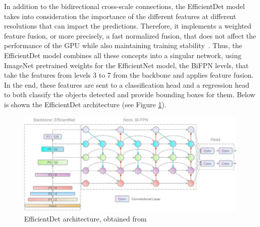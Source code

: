 In addition to the bidirectional cross-scale connections, the EfficientDet model takes into consideration the importance of the different features at different resolutions that can impact the predictions. Therefore, it implements a weighted feature fusion, or more precisely, a fast normalized fusion, that does not affect the performance of the GPU while also maintaining training stability~\cite{carte8}.
Thus, the EfficientDet model combines all these concepts into a singular network, using ImageNet pretrained weights for the EfficientNet model, the BiFPN levels, that take the features from levels 3 to 7 from the backbone and applies feature fusion. In the end, these features are sent to a classification head and a regression head to both classify the objects detected and provide bounding boxes for them. Below is shown the EfficientDet architecture (see Figure \ref{fig:fig7}).

\begin{figure}[!ht]
    \centering
    \includegraphics[width=1\textwidth]{figures/Figure7.jpg}
    \caption{EfficientDet architecture, obtained from ~\cite{link15}}
    \label{fig:fig7}
\end{figure}